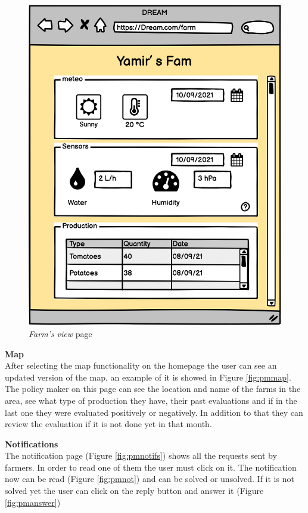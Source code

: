 \begin{figure}[H]
\begin{minipage}{0.39\textwidth}
        \includegraphics[width=1\textwidth]{images/mockups/PMFarm.png}
        \caption{\emph{Farm's view} page}
        \label{fig:pmfarm}
    \end{minipage}
\end{figure}

\textbf{Map} \\
After selecting the map functionality on the homepage the user can see an updated version of the map, 
an example of it is showed in Figure \ref{fig:pmmap}.
The policy maker on this page can see the location and name of the farms in the area, see what type of production 
they have, their past evaluations and if in the last one they were evaluated positively or negatively.
In addition to that they can review the evaluation if it is not done yet in that month.

\textbf{Notifications} \\
The notification page (Figure \ref{fig:pmnotifs}) shows all the requests sent by farmers. In order to read one of them the user must click on it. The notification now can be read (Figure \ref{fig:pmnot}) and can be solved or unsolved. 
If it is not solved yet the user can click on the reply button and answer it (Figure \ref{fig:pmanswer})

